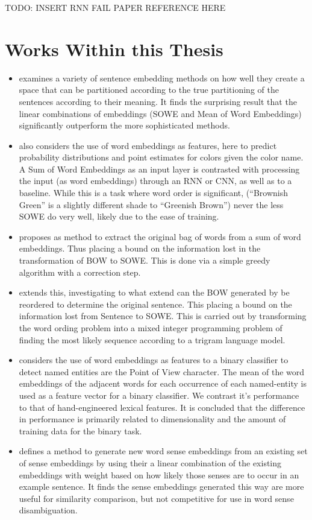 \documentclass{book}
\begin{document}
TODO: INSERT RNN FAIL PAPER REFERENCE HERE




\section{Works Within this Thesis}



\begin{itemize}
	\item {} examines a variety of sentence embedding methods on how well they create a space that can be partitioned according to the true partitioning of the sentences according to their meaning. It finds the surprising result that the linear combinations of embeddings (SOWE and Mean of Word Embeddings) significantly outperform the more sophisticated methods.
	\item {} also considers the use of word embeddings as features, here to predict probability distributions and point estimates for colors given the color name. A Sum of Word Embeddings as an input layer is contrasted with processing the input (as word embeddings) through an RNN or CNN, as well as to a baseline. While this is a task where word order is significant, (``Brownish Green'' is a slightly different shade to ``Greenish Brown'') never the less SOWE do very well, likely due to the ease of training.
	\item {} proposes as method to extract the original bag of words from a sum of word embeddings. Thus placing a bound on the information lost in the transformation of BOW to SOWE. This is done via a simple greedy algorithm with a correction step.
	\item {} extends this, investigating to what extend can the BOW generated by  be reordered to determine the original sentence. This placing a bound on the information lost from Sentence to SOWE. This is carried out by transforming the word ording problem into a mixed integer programming problem of finding the most likely sequence according to a trigram language model.
	\item {} considers the use of word embeddings as features to a binary classifier to detect named entities are the Point of View character. The mean of the word embeddings of the adjacent words for each occurrence of each named-entity is used as a feature vector for a binary classifier. We contrast it's performance to that of hand-engineered lexical features. It is concluded that the difference in performance is primarily related to dimensionality and the amount of training data for the binary task.
	\item {} defines a method to generate new word sense embeddings from an existing set of sense embeddings by using their a linear combination of the existing embeddings with weight based on how likely those senses are to occur in an example sentence. It finds the sense embeddings generated this way are more useful for similarity comparison, but not competitive for use in word sense disambiguation.
\end{itemize}
\end{document}
